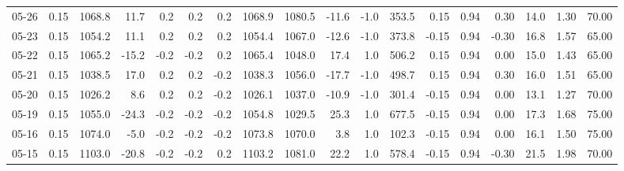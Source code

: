 \begin{threeparttable}
{\begin{tabular}{lrrrrrrrrrrrrrrrrr}
  05-26 &     0.15 & 1068.8 &              11.7 &               0.2 &                0.2 &                0.2 & 1068.9 & 1080.5 &      -11.6 &                     -1.0 &               353.5 &       0.15 &      0.94 &           0.30 &             14.0 &            1.30 &                  70.00 \\
  05-23 &     0.15 & 1054.2 &              11.1 &               0.2 &                0.2 &                0.2 & 1054.4 & 1067.0 &      -12.6 &                     -1.0 &               373.8 &      -0.15 &      0.94 &          -0.30 &             16.8 &            1.57 &                  65.00 \\
  05-22 &     0.15 & 1065.2 &             -15.2 &              -0.2 &               -0.2 &                0.2 & 1065.4 & 1048.0 &       17.4 &                      1.0 &               506.2 &       0.15 &      0.94 &           0.00 &             15.0 &            1.43 &                  65.00 \\
  05-21 &     0.15 & 1038.5 &              17.0 &               0.2 &                0.2 &               -0.2 & 1038.3 & 1056.0 &      -17.7 &                     -1.0 &               498.7 &       0.15 &      0.94 &           0.30 &             16.0 &            1.51 &                  65.00 \\
  05-20 &     0.15 & 1026.2 &               8.6 &               0.2 &                0.2 &               -0.2 & 1026.1 & 1037.0 &      -10.9 &                     -1.0 &               301.4 &      -0.15 &      0.94 &           0.00 &             13.1 &            1.27 &                  70.00 \\
  05-19 &     0.15 & 1055.0 &             -24.3 &              -0.2 &               -0.2 &               -0.2 & 1054.8 & 1029.5 &       25.3 &                      1.0 &               677.5 &      -0.15 &      0.94 &           0.00 &             17.3 &            1.68 &                  75.00 \\
  05-16 &     0.15 & 1074.0 &              -5.0 &              -0.2 &               -0.2 &               -0.2 & 1073.8 & 1070.0 &        3.8 &                      1.0 &               102.3 &      -0.15 &      0.94 &           0.00 &             16.1 &            1.50 &                  75.00 \\
  05-15 &     0.15 & 1103.0 &             -20.8 &              -0.2 &               -0.2 &                0.2 & 1103.2 & 1081.0 &       22.2 &                      1.0 &               578.4 &      -0.15 &      0.94 &          -0.30 &             21.5 &            1.98 &                  70.00 \\

\end{tabular}}
\end{threeparttable}
